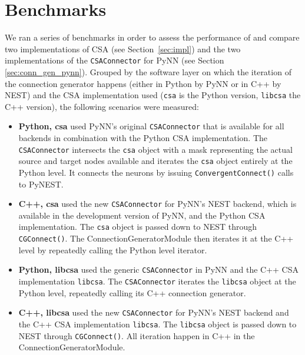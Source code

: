 \documentclass{frontiersSCNS} %
\begin{document}

\section{Benchmarks}\label{sec:benchmarks}

We ran a series of benchmarks in order to assess the performance of
and compare two implementations of CSA (see Section~\ref{sec:impl})
and the two implementations of the \verb|CSAConnector| for PyNN (see Section
\ref{sec:conn_gen_pynn}). Grouped by the software layer on which the
iteration of the connection generator happens (either in Python by PyNN
or in C++ by NEST) and the CSA implementation used (\verb|csa| is the Python
version, \verb|libcsa| the C++ version), the following scenarios were
measured:

\begin{itemize}
\item \textbf{Python, csa} used PyNN's original \verb|CSAConnector|
  that is available for all backends in combination with the Python
  CSA implementation. The \verb|CSAConnector| intersects the
  \verb|csa| object with a mask representing the actual source and
  target nodes available and iterates the \verb|csa| object entirely
  at the Python level. It connects the neurons by issuing
  \verb|ConvergentConnect()| calls to PyNEST.
\item \textbf{C++, csa} used the new \verb|CSAConnector| for PyNN's NEST
  backend, which is available in the development version of PyNN, and the
  Python CSA implementation. The \verb|csa| object is passed down to NEST
  through \verb|CGConnect()|. The ConnectionGeneratorModule then
  iterates it at the C++ level by repeatedly calling the Python level
  iterator.
\item \textbf{Python, libcsa} used the generic \verb|CSAConnector| in
  PyNN and the C++ CSA implementation \verb|libcsa|. The
  \verb|CSAConnector| iterates the \verb|libcsa| object at the Python
  level, repeatedly calling its C++ connection generator.
\item \textbf{C++, libcsa} used the new \verb|CSAConnector| for PyNN's
  NEST backend and the C++ CSA implementation \verb|libcsa|. The
  \verb|libcsa| object is passed down to NEST through
  \verb|CGConnect()|. All iteration happen in C++ in the
  ConnectionGeneratorModule.
\end{itemize}
\end{document}
